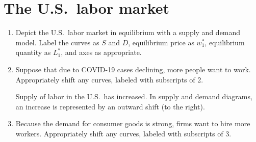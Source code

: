 \documentclass{assignment}
\begin{document}
\section{The U.S.~labor market}

\begin{enumerate}

\item Depict the U.S.~labor market in equilibrium with a supply and demand model. Label the curves as $S$ and $D$, equilibrium price as $w^*_1$, equilibrium quantity as $L^*_1$, and axes as appropriate.

\begin{solution}
\begin{center}
\end{center}
\vspace{-12pt}
\end{solution}

\item Suppose that due to COVID-19 cases declining, more people want to work. Appropriately shift any curves, labeled with subscripts of 2.

\begin{solution}
Supply of labor in the U.S.~has increased. In supply and demand diagrams, an increase is represented by an outward shift (to the right).

\begin{center}
\end{center}
\vspace{-12pt}
\end{solution}

\item Because the demand for consumer goods is strong, firms want to hire more workers. Appropriately shift any curves, labeled with subscripts of 3.


\end{enumerate}
\end{document}
